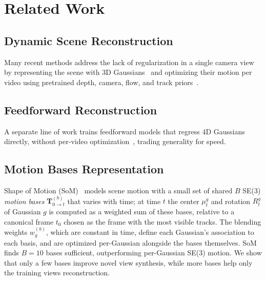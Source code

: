 \section{Related Work}


\label{sec:related-work}
\subsection{Dynamic Scene Reconstruction}
Many recent methods address the lack of regularization in a single camera view by representing the scene with 3D Gaussians~\cite{kerbl20233d} and optimizing their motion per video using pretrained depth, camera, flow, and track priors~\cite{lei2025mosca, wang2025shape, stearns2024dynamic, wang2025gflow}.

\subsection{Feedforward Reconstruction}
A separate line of work trains feedforward models that regress 4D Gaussians directly, without per-video optimization~\cite{lin2026movies}, trading generality for speed.

\subsection{Motion Bases Representation}
Shape of Motion (SoM)~\cite{wang2025shape} models scene motion with a small set of shared $B$ SE(3) \textit{motion bases} $\mathbf{T}^{(b)}_{0 \to t}$ that varies with time; at time $t$ the center $\mu_t^g$ and rotation $R_t^g$ of Gaussian $g$ is computed as a weighted sum of these bases, relative to a canonical frame $t_0$ chosen as the frame with the most visible tracks. The blending weights $w^{(b)}_g$, which are constant in time, define each Gaussian's association to each basis, and are optimized per-Gaussian alongside the bases themselves. SoM finds $B=10$ bases sufficient, outperforming per-Gaussian SE(3) motion. We show that only a few bases improve novel view synthesis, while more bases help only the training views reconstruction.




